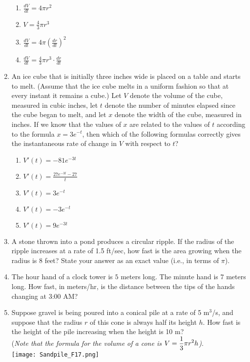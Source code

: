 \documentclass[12pt]{report}
\begin{document}
\begin{enumerate}
\begin{enumerate}
\item $\frac{dV}{dt}=4\pi r^2$

\item $V=\frac{4}{3}\pi r^3$

\item $\frac{dV}{dt}=4\pi\left(\frac{dr}{dt}\right)^2$

\item $\frac{dV}{dt}=\frac{4}{3}\pi r^3\cdot \frac{dr}{dt}$

\end{enumerate}

\item An ice cube that is initially three inches wide is placed on a table and starts to melt. (Assume that the ice cube melts in a uniform fashion so that at every instant it remains a cube.) Let $V$ denote the volume of the cube, measured in cubic inches, let $t$ denote the number of minutes elapsed since the cube began to melt, and let $x$ denote the width of the cube, measured in inches. If we know that the values of $x$ are related to the values of $t$ according to the formula $x=3e^{-t}$, then which of the following formulas correctly gives the instantaneous rate of change in $V$ with respect to $t$?

\begin{enumerate}

\item $V'(t)=-81e^{-3t}$

\item $V'(t)=\frac{27e^{-3t}-27}{t}$

\item $V'(t)=3e^{-t}$

\item $V'(t)=-3e^{-t}$

\item $V'(t)=9e^{-3t}$

\end{enumerate}

\item A stone thrown into a pond produces a circular ripple. If the radius of the ripple increases at a rate of 1.5 ft/sec, how fast is the area growing when the radius is 8 feet? State your answer as an exact value (i.e., in terms of $\pi$).

\item The hour hand of a clock tower is $5$ meters long. The minute hand is $7$ meters long. How fast, in meters/hr, is the distance between the tips of the hands changing at 3:00 AM?




\item Suppose gravel is being poured into a conical pile at a rate of 5 m$^3$/s, and suppose that the radius $r$ of this cone is always half its height $h$. How fast is the height of the pile increasing when the height is 10 m? \\ (\textit{Note that the formula for the volume of a cone is $\displaystyle V = \frac{1}{3}\pi r^2h$)}.\\
\texttt{[image: Sandpile\_F17.png]}

\end{enumerate}
\end{document}
